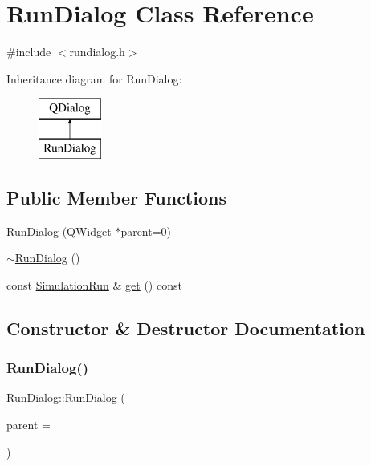 \hypertarget{class_run_dialog}{}\section{Run\+Dialog Class Reference}
\label{class_run_dialog}


{\ttfamily \#include $<$rundialog.\+h$>$}

Inheritance diagram for Run\+Dialog\+:\begin{figure}[H]
\begin{center}
\leavevmode
\includegraphics[height=2.000000cm]{de/d8e/class_run_dialog}
\end{center}
\end{figure}
\subsection*{Public Member Functions}
\begin{DoxyCompactItemize}
\item 
\mbox{\hyperlink{class_run_dialog_ae587d8fd095af1f7d14b3419d657b761}{Run\+Dialog}} (Q\+Widget $\ast$parent=0)
\item 
\mbox{\hyperlink{class_run_dialog_adff87d89fbb214d424e26f929956d02b}{$\sim$\+Run\+Dialog}} ()
\item 
const \mbox{\hyperlink{class_simulation_run}{Simulation\+Run}} \& \mbox{\hyperlink{class_run_dialog_ac2150b4c80c368023f74cdad8d10c455}{get}} () const
\end{DoxyCompactItemize}


\subsection{Constructor \& Destructor Documentation}
\mbox{\label{class_run_dialog_ae587d8fd095af1f7d14b3419d657b761}} 
\subsubsection{\texorpdfstring{RunDialog()}{RunDialog()}}
{\footnotesize\ttfamily Run\+Dialog\+::\+Run\+Dialog (\begin{DoxyParamCaption}\item[{Q\+Widget $\ast$}]{parent = {} }\end{DoxyParamCaption})\hspace{0.3cm}{\ttfamily [explicit]}}

